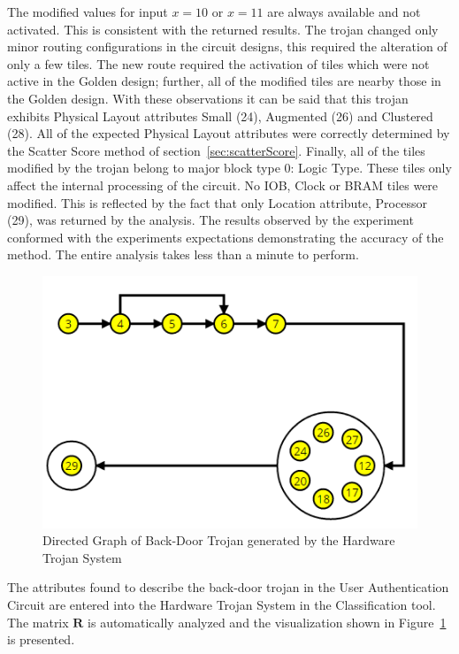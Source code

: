 \documentclass[journal, hidelinks]{IEEEtran}
\begin{document}
The modified values for input $x=10$ or $x=11$ are always available and not activated.
This is consistent with the returned results.
The trojan changed only minor routing configurations in the circuit designs, this required the alteration of only a few tiles.
The new route required the activation of tiles which were not active in the Golden design; further, all of the modified tiles are nearby those in the Golden design. 
With these observations it can be said that this trojan exhibits Physical Layout attributes Small (24), Augmented (26) and Clustered (28). 
All of the expected Physical Layout attributes were correctly determined by the Scatter Score method of section~\ref{sec:scatterScore}.
Finally, all of the tiles modified by the trojan belong to major block type 0: Logic Type.
These tiles only affect the internal processing of the circuit.
No IOB, Clock or BRAM tiles were modified.
This is reflected by the fact that only Location attribute, Processor (29), was returned by the analysis.
The results observed by the experiment conformed with the experiments expectations demonstrating the accuracy of the method.
The entire analysis takes less than a minute to perform.
\begin{figure}[h]
	\centering
	\includegraphics[width=0.91\linewidth]{Figures/backDoorVisual}
	\caption[Directed Graph of Back-Door Trojan generated by the Hardware Trojan System]{Directed Graph of Back-Door Trojan generated by the Hardware Trojan System}
	\label{fig:backDoorVisual}
\end{figure}
The attributes found to describe the back-door trojan in the User Authentication Circuit are entered into the Hardware Trojan System in the Classification tool.
The matrix $\mathbf{R}$ is automatically analyzed and the visualization shown in Figure~\ref{fig:backDoorVisual} is presented.
\end{document}
